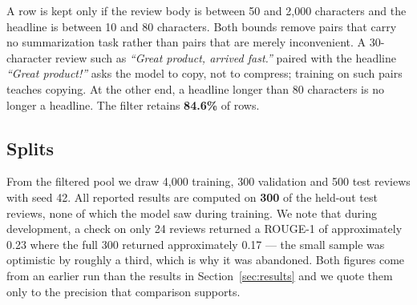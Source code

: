 A row is kept only if the review body is between 50 and 2{,}000 characters and
the headline is between 10 and 80 characters. Both bounds remove pairs that
carry no summarization task rather than pairs that are merely inconvenient. A
30-character review such as \emph{``Great product, arrived fast.''} paired with
the headline \emph{``Great product!''} asks the model to copy, not to compress;
training on such pairs teaches copying. At the other end, a headline longer
than 80 characters is no longer a headline. The filter retains \textbf{84.6\%}
of rows.

\subsection{Splits}

From the filtered pool we draw 4{,}000 training, 300 validation and 500 test
reviews with seed 42. All reported results are computed on \textbf{300} of the
held-out test reviews, none of which the model saw during training. We note that during development, a check on only 24 reviews returned a ROUGE-1
of approximately 0.23 where the full 300 returned approximately 0.17 --- the
small sample was optimistic by roughly a third, which is why it was abandoned.
Both figures come from an earlier run than the results in
Section~\ref{sec:results} and we quote them only to the precision that
comparison supports.
